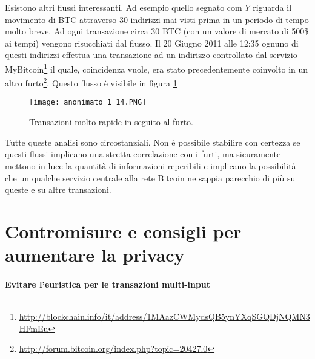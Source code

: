 Esistono altri flussi interessanti. Ad esempio quello segnato com $Y$ riguarda il movimento di BTC attraverso 30 indirizzi mai visti prima in un periodo di tempo molto breve. Ad ogni transazione circa 30 BTC (con un valore di mercato di 500\$ ai tempi) vengono risucchiati dal flusso. Il 20 Giugno 2011 alle 12:35 ognuno di questi indirizzi effettua una transazione ad un indirizzo controllato dal servizio MyBitcoin\footnote{\url{http://blockchain.info/it/address/1MAazCWMydsQB5ynYXqSGQDjNQMN3HFmEu}} il quale, coincidenza vuole, era stato precedentemente coinvolto in un altro furto\footnote{\url{http://forum.bitcoin.org/index.php?topic=20427.0}}. Questo flusso è visibile in figura \ref{anonimato_1_14}

\begin{figure}[htbp]
\centering
\texttt{[image: anonimato\_1\_14.PNG]}
\caption[Transazioni rapide]{Transazioni molto rapide in seguito al furto.\label{anonimato_1_14}}
\end{figure}

Tutte queste analisi sono circostanziali. Non è possibile stabilire con certezza se questi flussi implicano una stretta correlazione con i furti, ma sicuramente mettono in luce la quantità di informazioni reperibili e implicano la possibilità che un qualche servizio centrale alla rete Bitcoin ne sappia parecchio di più su queste e su altre transazioni.

\section{Contromisure e consigli per aumentare la privacy}

\paragraph{Evitare l'euristica per le transazioni multi-input}

